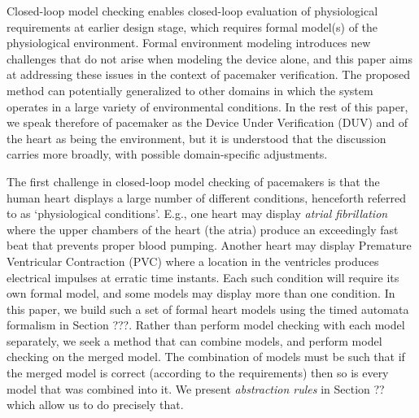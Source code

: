 Closed-loop model checking enables closed-loop evaluation of physiological requirements at earlier design stage, which requires formal model(s) of the physiological environment. 
Formal environment modeling introduces new challenges that do not arise when modeling the device alone, and this paper aims at addressing these issues in the context of pacemaker verification.
The proposed method can potentially generalized to other domains in which the system operates in a large variety of environmental conditions.
In the rest of this paper, we speak therefore of pacemaker as the Device Under Verification (DUV) and of the heart as being the environment, but it is understood that the discussion carries more broadly, with possible domain-specific adjustments.

The first challenge in closed-loop model checking of pacemakers is that the human heart displays a large number of different conditions, henceforth referred to as `physiological conditions'.
E.g., one heart may display \emph{atrial fibrillation} where the upper chambers of the heart (the atria) produce an exceedingly fast beat that prevents proper blood pumping.
Another heart may display Premature Ventricular Contraction (PVC) where a location in the ventricles produces electrical impulses at erratic time instants.
Each such condition will require its own formal model, and some models may display more than one condition.
In this paper, we build such a set of formal heart models using the timed automata formalism in Section ???.
Rather than perform model checking with each model separately, we seek a method that can combine models, and perform model checking on the merged model. 
The combination of models must be such that if the merged model is correct (according to the requirements) then so is every model that was combined into it.
We present \emph{abstraction rules} in Section ?? which allow us to do precisely that.

